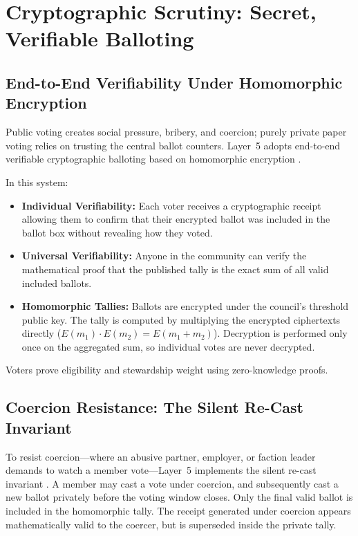 \section{Cryptographic Scrutiny: Secret, Verifiable Balloting}
\label{sec:l5-voting}

\subsection{End-to-End Verifiability Under Homomorphic Encryption}

Public voting creates social pressure, bribery, and coercion; purely private paper voting relies on trusting the central ballot counters. Layer~5 adopts end-to-end verifiable cryptographic balloting based on homomorphic encryption \parencite{adida2008helios}.

In this system:
\begin{itemize}
  \item \textbf{Individual Verifiability:} Each voter receives a cryptographic receipt allowing them to confirm that their encrypted ballot was included in the ballot box without revealing how they voted.
  \item \textbf{Universal Verifiability:} Anyone in the community can verify the mathematical proof that the published tally is the exact sum of all valid included ballots.
  \item \textbf{Homomorphic Tallies:} Ballots are encrypted under the council's threshold public key. The tally is computed by multiplying the encrypted ciphertexts directly ($E(m_1) \cdot E(m_2) = E(m_1 + m_2)$). Decryption is performed only once on the aggregated sum, so individual votes are never decrypted.
\end{itemize}

Voters prove eligibility and stewardship weight using zero-knowledge proofs.

\subsection{Coercion Resistance: The Silent Re-Cast Invariant}

To resist coercion—where an abusive partner, employer, or faction leader demands to watch a member vote—Layer~5 implements the silent re-cast invariant \parencite{juels2005coercion}. A member may cast a vote under coercion, and subsequently cast a new ballot privately before the voting window closes. Only the final valid ballot is included in the homomorphic tally. The receipt generated under coercion appears mathematically valid to the coercer, but is superseded inside the private tally.

